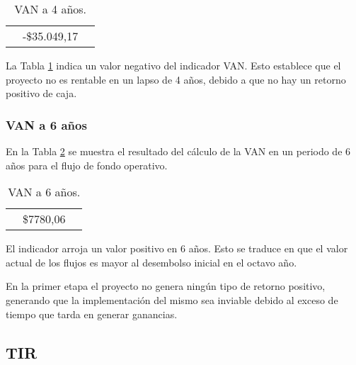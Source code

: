\begin{table}[H]
  \centering
    \begin{tabular}{|cc|r|}
    \rowcolor[rgb]{ .773,  .851,  .945} \multicolumn{3}{c}{\textbf{a 4 años}} \bigstrut[b]\\
    \hline
    \rowcolor[rgb]{ .773,  .851,  .945} \multicolumn{2}{|c|}{\textbf{VAN }} & \cellcolor[rgb]{ 1,  1,  1}\textcolor[rgb]{ 1,  0,  0}{-\$35.049,17} \bigstrut\\
    \hline
    \end{tabular}%
  \caption{VAN a 4 años.}  
  \label{tab:van-4}%
\end{table}%


La Tabla \ref{tab:van-4} indica un valor negativo del indicador VAN. Esto establece que el proyecto no es rentable en un lapso de 4 años, debido a que no hay un retorno positivo de caja. 

\subsubsection{VAN a 6 años}

En la Tabla \ref{tab:van-6} se muestra el resultado del cálculo de la VAN en un periodo de 6 años para el flujo de fondo operativo.

\begin{table}[H]
  \centering

    \begin{tabular}{|cc|r|}
    \rowcolor[rgb]{ .773,  .851,  .945} \multicolumn{3}{c}{\textbf{a 6 años}} \bigstrut[b]\\
    \hline
    \rowcolor[rgb]{ .773,  .851,  .945} \multicolumn{2}{|c|}{\textbf{VAN }} & \cellcolor[rgb]{ 1,  1,  1}\$7780,06 \bigstrut\\
    \hline
    \end{tabular}%
  \caption{VAN a 6 años.}    
  \label{tab:van-6}%
\end{table}%


El indicador arroja un valor positivo en 6 años. Esto se traduce en que el valor actual de los flujos es mayor al desembolso inicial en el octavo año.

En la primer etapa el proyecto no genera ningún tipo de retorno positivo, generando que la implementación del mismo sea inviable debido al exceso de tiempo que tarda en generar ganancias.

\subsection{TIR}

